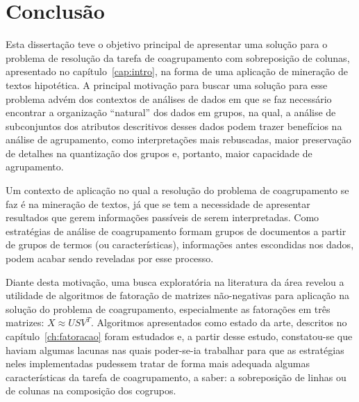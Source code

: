 \documentclass[
    12pt,                %
    oneside,            %
    a4paper,            %
    english,            %
    brazil                %
    ]{abntex2ppgsi}
\begin{document}

\chapter{Conclusão}
\label{ch:conclusoes}

Esta dissertação teve o objetivo principal de apresentar uma solução para o problema de resolução da tarefa de coagrupamento com sobreposição de colunas, apresentado no capítulo~\ref{cap:intro}, na forma de uma aplicação de mineração de textos hipotética.
A principal motivação para buscar uma solução para esse problema advém dos contextos de análises de dados em que se faz necessário encontrar a organização ``natural'' dos dados em grupos, na qual, a análise de subconjuntos dos atributos descritivos desses dados podem trazer benefícios na análise de agrupamento, como interpretações mais rebuscadas, maior preservação de detalhes na quantização dos grupos e, portanto, maior capacidade de agrupamento.

Um contexto de aplicação no qual a resolução do problema de coagrupamento se faz é na mineração de textos, já que se tem a necessidade de apresentar resultados que gerem informações passíveis de serem interpretadas.
Como estratégias de análise de coagrupamento formam grupos de documentos a partir de grupos de termos (ou características), informações antes escondidas nos dados, podem acabar sendo reveladas por esse processo.

Diante desta motivação, uma busca exploratória na literatura da área revelou a utilidade de algoritmos de fatoração de matrizes não-negativas para aplicação na solução do problema de coagrupamento, especialmente as fatorações em três matrizes: $X \approx USV^T$.
Algoritmos apresentados como estado da arte, descritos no capítulo~\ref{ch:fatoracao} foram estudados e, a partir desse estudo, constatou-se que haviam algumas lacunas nas quais poder-se-ia trabalhar para que as estratégias neles implementadas pudessem tratar de forma mais adequada algumas características da tarefa de coagrupamento, a saber: a sobreposição de linhas ou de colunas na composição dos cogrupos.
\end{document}
